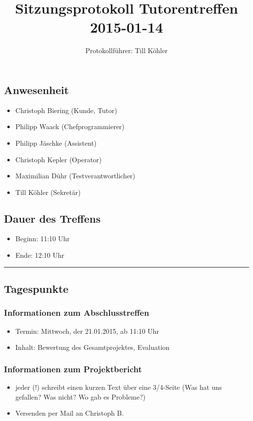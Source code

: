 \documentclass[12pt,a4paper]{article}
\author{Protokollführer: Till Köhler}
\title{Sitzungsprotokoll Tutorentreffen 2015-01-14}
\date{}
\begin{document}
\maketitle

\subsection*{Anwesenheit}
\medskip
\begin{itemize}
\item Christoph Biering (Kunde, Tutor)
\item Philipp Waack (Chefprogrammierer)
\item Philipp Jäschke (Assistent)
\item Christoph Kepler (Operator)
\item Maximilian Dühr (Testverantwortlicher)
\item Till Köhler (Sekretär)
\end{itemize}

\subsection*{Dauer des Treffens}
\medskip
\begin{itemize}
\item Beginn: 11:10 Uhr
\item Ende: 12:10 Uhr
\end{itemize}

\noindent\rule{\textwidth}{1pt}

\subsection*{Tagespunkte}
\medskip

\subsubsection*{Informationen zum Abschlusstreffen}
\begin{itemize}
\item Termin: Mittwoch, der 21.01.2015, ab 11:10 Uhr
\item Inhalt: Bewertung des Gesamtprojektes, Evaluation
\end{itemize}

\subsubsection*{Informationen zum Projektbericht}
\begin{itemize}
\item jeder (!) schreibt einen kurzen Text über eine 3/4-Seite (Was hat uns gefallen? Was nicht? Wo gab es Probleme?)
\item Versenden per Mail an Christoph B.
\end{itemize}
\end{document}
